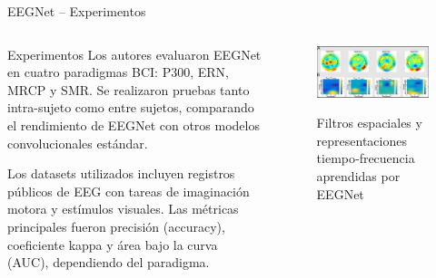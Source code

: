 \documentclass{beamer}
\begin{document}
\begin{frame}{EEGNet – Experimentos}
\begin{columns}[T] %
    \begin{column}{0.50\textwidth}
\begin{block}{Experimentos}
Los autores evaluaron EEGNet en cuatro paradigmas BCI: P300, ERN, MRCP y SMR. Se realizaron pruebas tanto intra-sujeto como entre sujetos, comparando el rendimiento de EEGNet con otros modelos convolucionales estándar.    

Los datasets utilizados incluyen registros públicos de EEG con tareas de imaginación motora y estímulos visuales. Las métricas principales fueron precisión (accuracy), coeficiente kappa y área bajo la curva (AUC), dependiendo del paradigma.
        \end{block}
    \end{column}

    \begin{column}{0.5\textwidth}
        \begin{figure}
            \centering
            \href{https://ar5iv.labs.arxiv.org/html/1611.08024}{%
            \includegraphics[width=\linewidth]{compactConvolutional.png}%
            }
            \caption{\small Filtros espaciales y representaciones tiempo‑frecuencia aprendidas por EEGNet}
            \label{fig:flujo_eeg}
        \end{figure}
    \end{column}
\end{columns}
\end{frame}
\end{document}
